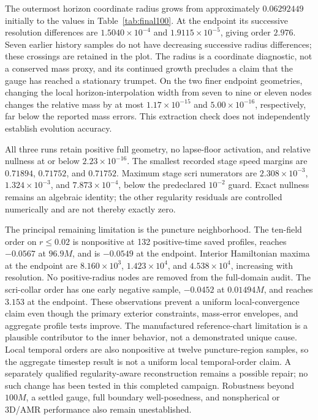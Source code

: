 \documentclass[11pt]{article}
\begin{document}
The outermost horizon coordinate radius grows from approximately $0.06292449$ initially to the values in Table~\ref{tab:final100}. At the endpoint its successive resolution differences are $1.5040\times10^{-4}$ and $1.9115\times10^{-5}$, giving order $2.976$. Seven earlier history samples do not have decreasing successive radius differences; these crossings are retained in the plot. The radius is a coordinate diagnostic, not a conserved mass proxy, and its continued growth precludes a claim that the gauge has reached a stationary trumpet. On the two finer endpoint geometries, changing the local horizon-interpolation width from seven to nine or eleven nodes changes the relative mass by at most $1.17\times10^{-15}$ and $5.00\times10^{-16}$, respectively, far below the reported mass errors. This extraction check does not independently establish evolution accuracy.

\pagebreak
All three runs retain positive full geometry, no lapse-floor activation, and relative nullness at or below $2.23\times10^{-16}$. The smallest recorded stage speed margins are $0.71894$, $0.71752$, and $0.71752$. Maximum stage scri numerators are $2.308\times10^{-3}$, $1.324\times10^{-3}$, and $7.873\times10^{-4}$, below the predeclared $10^{-2}$ guard. Exact nullness remains an algebraic identity; the other regularity residuals are controlled numerically and are not thereby exactly zero.

The principal remaining limitation is the puncture neighborhood. The ten-field order on $r\leq0.02$ is nonpositive at 132 positive-time saved profiles, reaches $-0.0567$ at $96.9M$, and is $-0.0549$ at the endpoint. Interior Hamiltonian maxima at the endpoint are $8.160\times10^3$, $1.423\times10^4$, and $4.538\times10^4$, increasing with resolution. No positive-radius nodes are removed from the full-domain audit. The scri-collar order has one early negative sample, $-0.0452$ at $0.01494M$, and reaches $3.153$ at the endpoint. These observations prevent a uniform local-convergence claim even though the primary exterior constraints, mass-error envelopes, and aggregate profile tests improve. The manufactured reference-chart limitation is a plausible contributor to the inner behavior, not a demonstrated unique cause. Local temporal orders are also nonpositive at twelve puncture-region samples, so the aggregate timestep result is not a uniform local temporal-order claim. A separately qualified regularity-aware reconstruction remains a possible repair; no such change has been tested in this completed campaign. Robustness beyond $100M$, a settled gauge, full boundary well-posedness, and nonspherical or 3D/AMR performance also remain unestablished.
\end{document}
